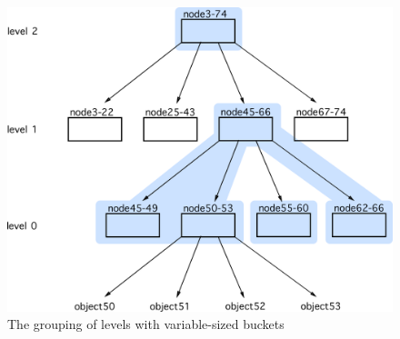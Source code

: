 \begin{figure}[!htb]
  \centering
  \includegraphics[width=\textwidth,height=\textheight,keepaspectratio]{img/dynamic-buckets.png}
  \caption{ The grouping of levels with variable-sized buckets}
  \label{fig:Variable-size-buckets}
\end{figure}


